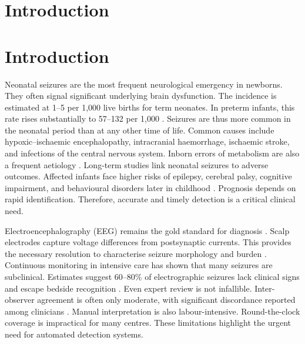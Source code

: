 \documentclass[pdflatex,sn-mathphys-num]{sn-jnl}%
\theoremstyle{thmstyleone}%
\theoremstyle{thmstyletwo}%
\theoremstyle{thmstylethree}%
\begin{document}
\section{Introduction}\label{sec1}

\section{Introduction}\label{sec1}

Neonatal seizures are the most frequent neurological emergency in newborns. They often signal significant underlying brain dysfunction. The incidence is estimated at 1--5 per 1{,}000 live births for term neonates. In preterm infants, this rate rises substantially to 57--132 per 1{,}000 \cite{glass2016}. Seizures are thus more common in the neonatal period than at any other time of life. Common causes include hypoxic--ischaemic encephalopathy, intracranial haemorrhage, ischaemic stroke, and infections of the central nervous system. Inborn errors of metabolism are also a frequent aetiology \cite{ronen2007}. Long-term studies link neonatal seizures to adverse outcomes. Affected infants face higher risks of epilepsy, cerebral palsy, cognitive impairment, and behavioural disorders later in childhood \cite{glass2009}. Prognosis depends on rapid identification. Therefore, accurate and timely detection is a critical clinical need.

Electroencephalography (EEG) remains the gold standard for diagnosis \cite{shellhaas2011}. Scalp electrodes capture voltage differences from postsynaptic currents. This provides the necessary resolution to characterise seizure morphology and burden \cite{boylan2013}. Continuous monitoring in intensive care has shown that many seizures are subclinical. Estimates suggest 60--80\% of electrographic seizures lack clinical signs and escape bedside recognition \cite{murray2008}. Even expert review is not infallible. Inter-observer agreement is often only moderate, with significant discordance reported among clinicians \cite{stevenson2015}. Manual interpretation is also labour-intensive. Round-the-clock coverage is impractical for many centres. These limitations highlight the urgent need for automated detection systems.
\end{document}
